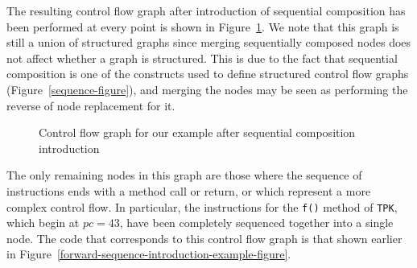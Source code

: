 The resulting control flow graph after introduction of sequential
composition has been performed at every point is shown in
Figure~\ref{example-control-flow-graph-after-sequence-introduction-figure}.
We note that this graph is still a union of structured graphs since
merging sequentially composed nodes does not affect whether a graph is
structured.
This is due to the fact that sequential composition is one of the
constructs used to define structured control flow graphs
(Figure~\ref{sequence-figure}), and merging the nodes may be seen as
performing the reverse of node replacement for it.
\begin{figure}
  \begin{center}
  \end{center}
  \caption{Control flow graph for our example after sequential composition introduction}
  \label{example-control-flow-graph-after-sequence-introduction-figure}
\end{figure}

The only remaining nodes in this graph are those where the sequence of
instructions ends with a method call or return, or which represent a
more complex control flow.
In particular, the instructions for the \texttt{f()} method of
\texttt{TPK}, which begin at $pc = 43$, have been completely sequenced
together into a single node.
The code that corresponds to this control flow graph is that shown
earlier in Figure~\ref{forward-sequence-introduction-example-figure}.